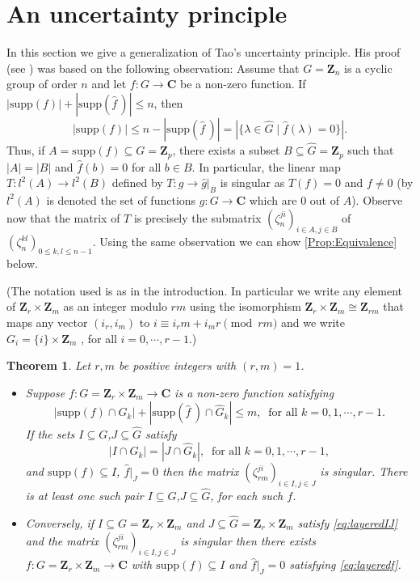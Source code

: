 \documentclass[a4paper,12pt,reqno]{amsart}
\newtheorem{theorem}{Theorem}
\def\Z{\mathbf{Z}}
\def\C{\mathbf{C}}
\def\supp{\mathrm{supp}}
\begin{document}
\section{An uncertainty principle}\label{Sec:Uncertainty}
In this section we give a generalization of Tao's uncertainty principle. His proof  (see \cite{Tao})
 was based on the following observation: Assume that $G =\Z_n$ is a cyclic group of order $n$ and let 
\( f: G \to \C \) be   a non-zero function. 
If \( |\supp(f)| + |\supp(\widehat{f} \, )| \leq n \), then  
\[ |\supp(f)| \leq n - |\supp(\widehat{f} \, )| = |\{ \lambda \in \widehat{G} \mid \widehat{f} (\lambda) = 0 \}|. \]
Thus, if $ A = \supp(f)\subseteq G=  \Z_p$, there exists a subset $ B \subseteq \widehat G= \Z_p $
such that $|A| = |B| $ and $ \widehat{f}(b) = 0 $ for all $ b \in B $. In particular, the linear map $T: l^2(A) \to l^2(B)$  defined by $T: g \to \widehat{g} |_B $ is singular as $T(f)=0$ and  $f\neq 0$ 
(by  $l^2(A)$ is denoted the set of functions $g: G \to \C$  which are 
$0$ out of $A$).
Observe now that the matrix of $T$ is precisely the submatrix $(\zeta_n^{ji})_{i\in A, j \in B}$ of $(\zeta_n^{kl})_{0 \leq k , l \leq n-1}$. 
Using the same  observation we can show \autoref{Prop:Equivalence} below.


(The notation used is as in the introduction. In particular we write any element of $\Z_r \times \Z_m$ as an integer modulo $rm$ using  the isomorphism $\Z_r \times \Z_m \cong \Z_{rm} $ that maps any vector  $(i_r, i_m)$  to $i\equiv i_rm +i_mr  \pmod {rm}$ and we write   $G_i= \{i\} \times \Z_m$ , for all $i=0, \cdots , r-1$.)




\begin{theorem}\label{Prop:Equivalence}
Let $r, m$ be positive integers with  $(r, m)=1$.
\begin{itemize}
\item[(a)]
Suppose $f : G=\Z_r \times \Z_m \to \C$  is  a non-zero function   satisfying  
\begin{equation}\label{eq:layeredf}
|\supp(f) \cap G_k| + |\supp(\widehat{f} \, ) \cap \widehat{G}_k| \leq m,  \ 
  \text{ for all } k=0,1, \cdots ,r-1.
\end{equation}
If the sets $I \subseteq G$,$J \subseteq \widehat{G}$ satisfy
\begin{equation}\label{eq:layeredIJ}
  |I \cap G_k|= |J \cap \widehat{G}_k|,\ \text{ for all } k=0,1, \cdots ,r-1,  
\end{equation}
and $\supp(f) \subseteq I$, $\widehat{f}|_J =0$ then the matrix $(\zeta_{rm}^{ji})_{i \in I, j \in J}$ is singular. There is at least one such pair $I \subseteq G$,$J \subseteq \widehat{G}$,  for each such $f$.
\item[(b)]
Conversely, if  $I \subseteq G =\Z_r \times \Z_m$ and $J \subseteq \widehat{G} = \Z_r \times \Z_m$  satisfy  \eqref{eq:layeredIJ} 
and the matrix $(\zeta_{rm}^{ji})_{i \in I, j \in J}$ is singular then there exists $f : G=\Z_r \times \Z_m \to \C$  with $\supp(f) \subseteq I$ and $\widehat{f}|_J = 0$ satisfying  \eqref{eq:layeredf}.
\end{itemize}

\end{theorem}
\end{document}
